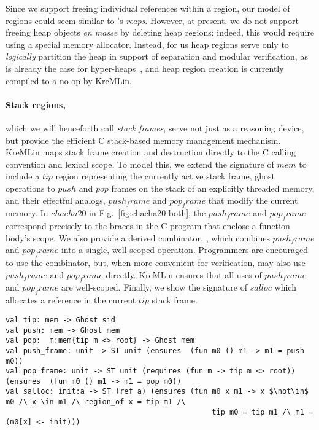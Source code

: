 Since we support freeing individual references within a region, our
model of regions could seem similar to \citet{berger02reaps}'s
\emph{reaps}. However, at present, we do not support
freeing heap objects \emph{en masse} by deleting heap regions;
indeed, this would require using a special memory allocator.
Instead, for us heap regions serve only to {\em logically} partition
the heap in support of separation and modular
verification, as is already the case for hyper-heaps~\cite{mumon},
and heap region creation is currently compiled to a no-op by KreMLin.

\paragraph*{Stack regions,} which we will henceforth call {\em stack
  frames}, serve not just as a reasoning device, but provide the
efficient C stack-based memory management mechanism. KreMLin maps
stack frame creation and destruction directly to
the C calling convention and lexical scope.
To model this, we extend the signature of \lst$mem$ to include a
\lst$tip$ region representing the currently active stack frame, ghost
operations to \lst$push$ and \lst$pop$ frames on the stack
of an explicitly threaded memory,
and their effectful analogs, \lst$push_frame$ and \lst$pop_frame$ that modify
the current memory.
%
In \lst$chacha20$ in Fig.~\ref{fig:chacha20-both}, the
\lst$push_frame$ and \lst$pop_frame$ correspond precisely to the
braces in the C program that enclose a function body's scope.
%
We also provide a derived combinator, ,
which combines \lst$push_frame$ and \lst$pop_frame$ into a single,
well-scoped operation. Programmers are encouraged to use the
 combinator, but, when more convenient
for verification, may also use \lst$push_frame$ and \lst$pop_frame$
directly. KreMLin ensures that all uses of \lst$push_frame$ and
\lst$pop_frame$ are well-scoped.
%
Finally, we show the signature of \lst$salloc$ which allocates a
reference in the current \lst$tip$ stack frame.

\begin{lstlisting}[numbers=none]
val tip: mem -> Ghost sid
val push: mem -> Ghost mem
val pop:  m:mem{tip m <> root} -> Ghost mem
val push_frame: unit -> ST unit (ensures  (fun m0 () m1 -> m1 = push m0))
val pop_frame: unit -> ST unit (requires (fun m -> tip m <> root)) (ensures  (fun m0 () m1 -> m1 = pop m0))
val salloc: init:a -> ST (ref a) (ensures (fun m0 x m1 -> x $\not\in$ m0 /\ x \in m1 /\ region_of x = tip m1 /\
                                               tip m0 = tip m1 /\ m1 = (m0[x] <- init)))
\end{lstlisting}

